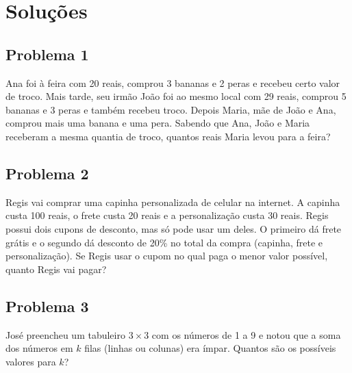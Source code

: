 \documentclass[12pt]{article}
\begin{document}
  \clearpage

  \section{\textsf{Soluções}}
  \subsection{Problema 1}
\begin{tcolorbox}[statementbox]
Ana foi à feira com 20 reais, comprou 3 bananas e 2 peras e recebeu certo valor de troco. Mais tarde, seu irmão João foi ao
mesmo local com 29 reais, comprou 5 bananas e 3 peras e também recebeu troco. Depois Maria, mãe de João e Ana, comprou mais uma
banana e uma pera. Sabendo que Ana, João e Maria receberam a mesma quantia de troco, quantos reais Maria levou para a feira?
\end{tcolorbox}

\clearpage

\subsection{Problema 2}
\begin{tcolorbox}[statementbox]
Regis vai comprar uma capinha personalizada de celular na internet. A capinha custa 100 reais, o frete custa 20 reais e a
personalização custa 30 reais. Regis possui dois cupons de desconto, mas só pode usar um deles. O primeiro dá frete grátis e o
segundo dá desconto de 20\% no total da compra (capinha, frete e personalização). Se Regis usar o cupom no qual paga o menor valor
possível, quanto Regis vai pagar?
\end{tcolorbox}

\clearpage

\subsection{Problema 3}
\begin{tcolorbox}[statementbox]
José preencheu um tabuleiro \(3\times3\) com os números de 1 a 9 e notou que a soma dos números em \(k\) filas (linhas ou colunas)
era ímpar. Quantos são os possíveis valores para \(k\)?
\end{tcolorbox}

\clearpage
\end{document}
